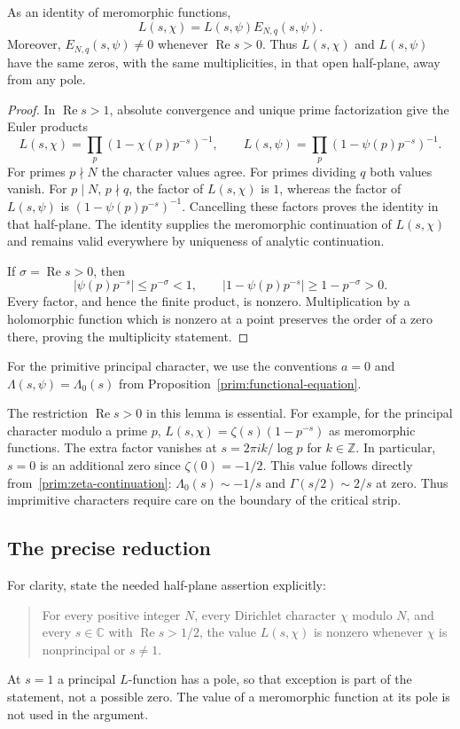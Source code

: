 \begin{lemma}\label{prim:change-level}
As an identity of meromorphic functions,
\[
 L(s,\chi)=L(s,\psi)E_{N,q}(s,\psi).
\]
Moreover, $E_{N,q}(s,\psi)\neq0$ whenever
$\operatorname{Re}s>0$.  Thus $L(s,\chi)$ and $L(s,\psi)$ have the same
zeros, with the same multiplicities, in that open half-plane, away from
any pole.
\end{lemma}

\begin{proof}
In $\operatorname{Re}s>1$, absolute convergence and unique prime
factorization give the Euler products
\[
 L(s,\chi)=\prod_p(1-\chi(p)p^{-s})^{-1},
 \qquad
 L(s,\psi)=\prod_p(1-\psi(p)p^{-s})^{-1}.
\]
For primes $p\nmid N$ the character values agree.  For primes dividing
$q$ both values vanish.  For $p\mid N$, $p\nmid q$, the factor of
$L(s,\chi)$ is $1$, whereas the factor of $L(s,\psi)$ is
$(1-\psi(p)p^{-s})^{-1}$.  Cancelling these factors proves the identity
in that half-plane.  The identity supplies the meromorphic continuation
of $L(s,\chi)$ and remains valid everywhere by uniqueness of analytic
continuation.

If $\sigma=\operatorname{Re}s>0$, then
\[
 |\psi(p)p^{-s}|\leq p^{-\sigma}<1,
 \qquad
 |1-\psi(p)p^{-s}|\geq1-p^{-\sigma}>0.
\]
Every factor, and hence the finite product, is nonzero.  Multiplication
by a holomorphic function which is nonzero at a point preserves the
order of a zero there, proving the multiplicity statement.
\end{proof}

For the primitive principal character, we use the conventions
$a=0$ and $\Lambda(s,\psi)=\Lambda_0(s)$ from
Proposition~\ref{prim:functional-equation}.

The restriction $\operatorname{Re}s>0$ in this lemma is essential.
For example, for the principal character modulo a prime $p$,
$L(s,\chi)=\zeta(s)(1-p^{-s})$ as meromorphic functions.
The extra factor vanishes at $s=2\pi i k/\log p$ for $k\in\mathbb Z$.
In particular, $s=0$ is an additional zero since $\zeta(0)=-1/2$.
This value follows directly from~\eqref{prim:zeta-continuation}:
$\Lambda_0(s)\sim-1/s$ and $\Gamma(s/2)\sim2/s$ at zero.
Thus imprimitive characters require care on the boundary of the critical
strip.

\subsection{The precise reduction}

For clarity, state the needed half-plane assertion explicitly:
\begin{quote}
For every positive integer $N$, every Dirichlet character $\chi$ modulo
$N$, and every $s\in\mathbb C$ with $\operatorname{Re}s>1/2$, the value
$L(s,\chi)$ is nonzero whenever $\chi$ is nonprincipal or $s\neq1$.
\end{quote}
At $s=1$ a principal $L$-function has a pole, so that exception is part of
the statement, not a possible zero.  The value of a meromorphic function
at its pole is not used in the argument.

